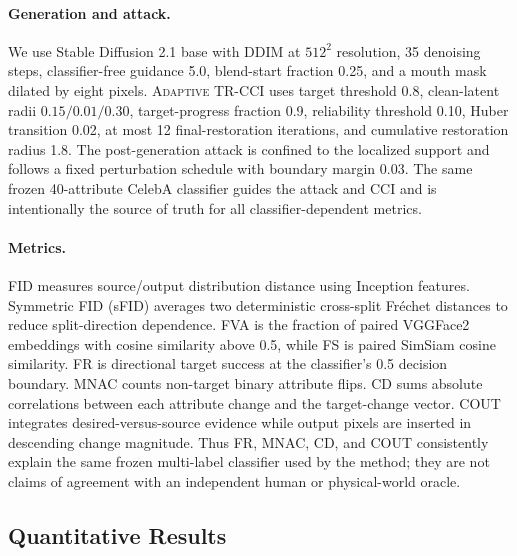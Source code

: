 \documentclass[10pt,twocolumn]{article}
\newcommand{\method}{\textsc{Adaptive TR-CCI}}
\begin{document}
\paragraph{Generation and attack.}
We use Stable Diffusion 2.1 base with DDIM at $512^2$ resolution, 35 denoising
steps, classifier-free guidance 5.0, blend-start fraction 0.25, and a mouth
mask dilated by eight pixels. \method{} uses target threshold 0.8, clean-latent
radii $0.15/0.01/0.30$, target-progress fraction 0.9, reliability threshold
0.10, Huber transition 0.02, at most 12 final-restoration iterations, and
cumulative restoration radius 1.8. The post-generation attack is confined to
the localized support and follows a fixed perturbation schedule with boundary
margin 0.03. The same frozen 40-attribute CelebA classifier guides the attack
and CCI and is intentionally the source of truth for all classifier-dependent
metrics.

\paragraph{Metrics.}
FID measures source/output distribution distance using Inception features.
Symmetric FID (sFID) averages two deterministic cross-split Fr\'echet distances
to reduce split-direction dependence. FVA is the fraction of paired VGGFace2
embeddings with cosine similarity above 0.5, while FS is paired SimSiam cosine
similarity. FR is directional target success at the classifier's 0.5 decision
boundary. MNAC counts non-target binary attribute flips. CD sums absolute
correlations between each attribute change and the target-change vector. COUT
integrates desired-versus-source evidence while output pixels are inserted in
descending change magnitude. Thus FR, MNAC, CD, and COUT consistently explain
the same frozen multi-label classifier used by the method; they are not claims
of agreement with an independent human or physical-world oracle.

\subsection{Quantitative Results}
\label{sec:results}
\end{document}
